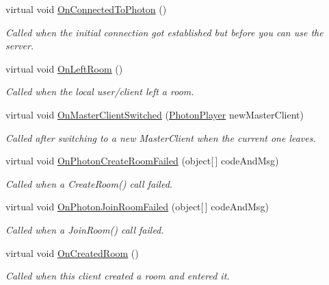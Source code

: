 \begin{DoxyCompactItemize}
\item 
virtual void \hyperlink{class_photon_1_1_pun_behaviour_addc4f79164cd22c37d330b5ee2e340c7}{On\+Connected\+To\+Photon} ()
\begin{DoxyCompactList}\small\item\em Called when the initial connection got established but before you can use the server. \end{DoxyCompactList}\item 
virtual void \hyperlink{class_photon_1_1_pun_behaviour_a4e9e2aebcfa279a2eec0020f0e44b57a}{On\+Left\+Room} ()
\begin{DoxyCompactList}\small\item\em Called when the local user/client left a room. \end{DoxyCompactList}\item 
virtual void \hyperlink{class_photon_1_1_pun_behaviour_a53833ef0f9be9906694fc600acc1b897}{On\+Master\+Client\+Switched} (\hyperlink{class_photon_player}{Photon\+Player} new\+Master\+Client)
\begin{DoxyCompactList}\small\item\em Called after switching to a new Master\+Client when the current one leaves. \end{DoxyCompactList}\item 
virtual void \hyperlink{class_photon_1_1_pun_behaviour_a9fb00e512c59fa60c0a95e0d6e4dbe89}{On\+Photon\+Create\+Room\+Failed} (object\mbox{[}$\,$\mbox{]} code\+And\+Msg)
\begin{DoxyCompactList}\small\item\em Called when a Create\+Room() call failed. \end{DoxyCompactList}\item 
virtual void \hyperlink{class_photon_1_1_pun_behaviour_ac808cb2ed21bbbe52a0d33f4d927644e}{On\+Photon\+Join\+Room\+Failed} (object\mbox{[}$\,$\mbox{]} code\+And\+Msg)
\begin{DoxyCompactList}\small\item\em Called when a Join\+Room() call failed. \end{DoxyCompactList}\item 
virtual void \hyperlink{class_photon_1_1_pun_behaviour_a67049b5cdc50467f4790aca093c34e82}{On\+Created\+Room} ()
\begin{DoxyCompactList}\small\item\em Called when this client created a room and entered it. \end{DoxyCompactList}\item 

\end{DoxyCompactItemize}
